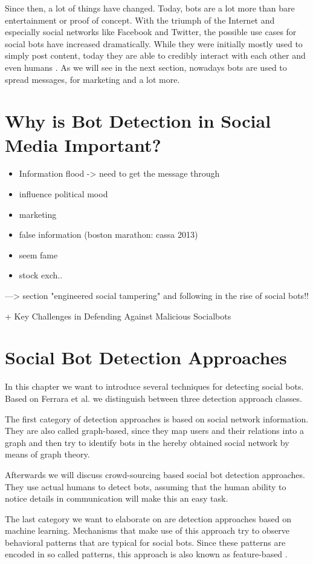 Since then, a lot of things have changed. Today, bots are a lot more than bare entertainment or proof of concept. With the triumph of the Internet and especially social networks like Facebook and Twitter, the possible use cases for social bots have increased dramatically. While they were initially mostly used to simply post content, today they are able to credibly interact with each other and even humans \cite{boshmaf13, hwang12}. As we will see in the next section, nowadays bots are used to spread messages, for marketing and a lot more.


\section{Why is Bot Detection in Social Media Important?}
\begin{itemize}
	\item Information flood -> need to get the message through
	\item influence political mood
	\item marketing
	\item false information (boston marathon: cassa 2013)
	\item seem fame
	\item stock exch..
\end{itemize}
---> section "engineered social tampering" and following in the rise of social bots!! 

+ Key Challenges in Defending Against Malicious Socialbots \cite{boshmaf12}
\section{Social Bot Detection Approaches}
In this chapter we want to introduce several techniques for detecting social bots. Based on Ferrara et al. \cite{ferrara15} we distinguish between three detection approach classes. 

The first category of detection approaches is based on social network information. They are also called graph-based, since they map users and their relations into a graph and then try to identify bots in the hereby obtained social network by means of graph theory. 

Afterwards we will discuss crowd-sourcing based social bot detection approaches. They use actual humans to detect bots, assuming that the human ability to notice details in communication will make this an easy task.

The last category we want to elaborate on are detection approaches based on machine learning. Mechanisms that make use of this approach try to observe behavioral patterns that are typical for social bots. Since these patterns are encoded in so called patterns, this approach is also known as feature-based \cite{ferrara15}. %


